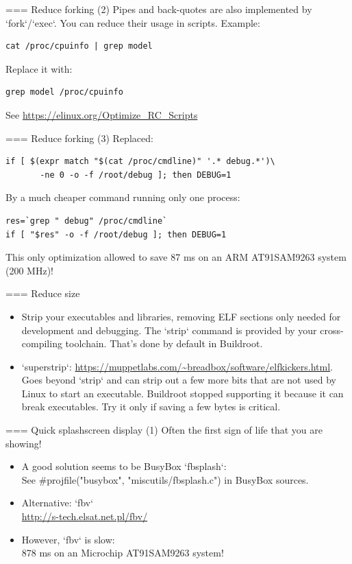 === Reduce forking (2)
Pipes and back-quotes are also implemented by
`fork`/`exec`.  You can reduce their usage in scripts. Example:
\begin{block}{}
\begin{verbatim}
cat /proc/cpuinfo | grep model
\end{verbatim}
\end{block}
Replace it with:
\begin{block}{}
\begin{verbatim}
grep model /proc/cpuinfo
\end{verbatim}
\end{block}
See \url{https://elinux.org/Optimize_RC_Scripts}


=== Reduce forking (3)
Replaced:
\begin{block}{}
\begin{verbatim}
if [ $(expr match "$(cat /proc/cmdline)" '.* debug.*')\
       -ne 0 -o -f /root/debug ]; then DEBUG=1
\end{verbatim}
\end{block}
By a much cheaper command running only one process:
\begin{block}{}
\begin{verbatim}
res=`grep " debug" /proc/cmdline`
if [ "$res" -o -f /root/debug ]; then DEBUG=1
\end{verbatim}
\end{block}
This only optimization allowed to save 87 ms on an ARM AT91SAM9263
system (200 MHz)!



=== Reduce size
\begin{itemize}
	\item Strip your executables and libraries, removing ELF sections
		only needed for development and debugging. The `strip`
		command is provided by your cross-compiling toolchain.
		That's done by default in Buildroot.
	\item `superstrip`:
		\url{https://muppetlabs.com/~breadbox/software/elfkickers.html}.
		Goes beyond `strip` and can strip out a few more bits
		that are not used by Linux to start an executable.
		Buildroot stopped supporting it because it can break
	        executables. Try it only if saving a few bytes is
		critical.
\end{itemize}


=== Quick splashscreen display (1)
Often the first sign of life that you are showing!
\begin{itemize}
\item A good solution seems to be BusyBox `fbsplash`:\\
      See #projfile("busybox", "miscutils/fbsplash.c") in BusyBox sources.
\item Alternative: `fbv`\\
      \url{http://s-tech.elsat.net.pl/fbv/}
\item However, `fbv` is slow:\\
      878 ms on an Microchip AT91SAM9263 system!
\end{itemize}


